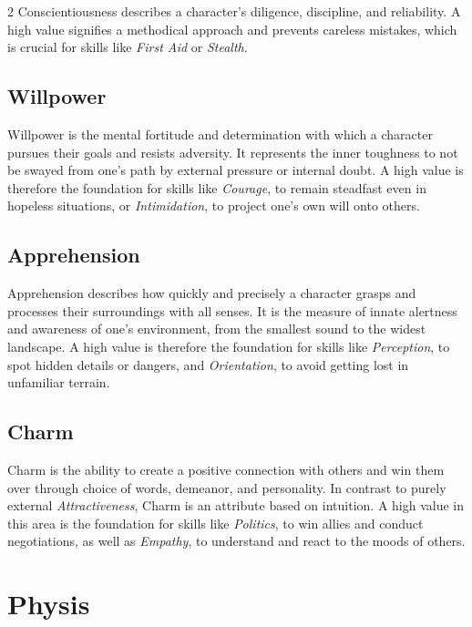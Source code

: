 \begin{multicols}{2}
Conscientiousness describes a character's diligence, discipline, and reliability. A high value signifies a methodical approach and prevents careless mistakes, which is crucial for skills like \textit{First Aid} or \textit{Stealth}.

\subsection{Willpower}

Willpower is the mental fortitude and determination with which a character pursues their goals and resists adversity. It represents the inner toughness to not be swayed from one's path by external pressure or internal doubt. A high value is therefore the foundation for skills like \textit{Courage}, to remain steadfast even in hopeless situations, or \textit{Intimidation}, to project one's own will onto others.

\subsection{Apprehension}

Apprehension describes how quickly and precisely a character grasps and processes their surroundings with all senses. It is the measure of innate alertness and awareness of one's environment, from the smallest sound to the widest landscape. A high value is therefore the foundation for skills like \textit{Perception}, to spot hidden details or dangers, and \textit{Orientation}, to avoid getting lost in unfamiliar terrain.

\subsection{Charm}

Charm is the ability to create a positive connection with others and win them over through choice of words, demeanor, and personality. In contrast to purely external \textit{Attractiveness}, Charm is an attribute based on intuition. A high value in this area is the foundation for skills like \textit{Politics}, to win allies and conduct negotiations, as well as \textit{Empathy}, to understand and react to the moods of others.

\section{Physis}


\end{multicols}
